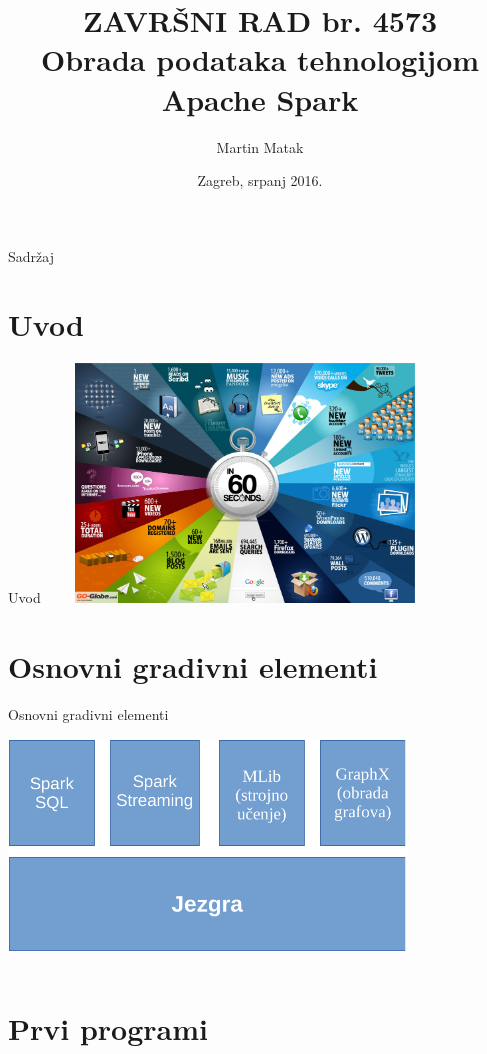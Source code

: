 \documentclass{beamer}
\title{ZAVRŠNI RAD br. 4573 \\ Obrada podataka tehnologijom Apache Spark}
\author{Martin Matak}
\institute[Fakultet elektrotehnike i računarstva]{SVEUČILIŠTE U ZAGREBU \\ FAKULTET ELEKTROTEHNIKE I RAČUNARSTVA}%
\date{Zagreb, srpanj 2016.}
\begin{document}
\begin{frame}
  \titlepage
\end{frame}

\begin{frame}{Sadržaj}
  \tableofcontents
\end{frame}

\section{Uvod}
\begin{frame}{Uvod}
	\includegraphics[width=300pt, height=180pt]{60seconds.jpg}%
\end{frame}

\section{Osnovni gradivni elementi}

\begin{frame}{Osnovni gradivni elementi}
	\includegraphics[width=300pt, height=180pt]{gradivniElementiCropped.pdf}%
\end{frame}

\section{Prvi programi}
\end{document}
